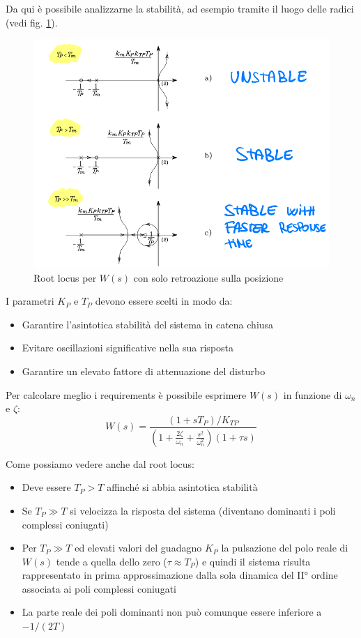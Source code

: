 Da qui è possibile analizzarne la stabilità, ad esempio tramite il luogo delle radici (vedi fig. \ref{fig:rootlocus1}).

\begin{figure}[ht!]
	\centering
	\includegraphics[width=0.7\linewidth]{images/root_locus_1}
	\caption{Root locus per $W(s)$ con solo retroazione sulla posizione}
	\label{fig:rootlocus1}
\end{figure}


I parametri $K_P$ e $T_P$ devono essere scelti in modo da:
\begin{itemize}
	\item Garantire l’asintotica stabilità del sistema in catena chiusa
	\item Evitare oscillazioni significative nella sua risposta
	\item Garantire un elevato fattore di attenuazione del disturbo 
\end{itemize}


Per calcolare meglio i requirements è possibile esprimere $W(s)$ in funzione di $\omega_n$ e $\zeta$:
$$
W(s) = \frac{(1+sT_P)/K_{TP}}{\left( 1 + \frac{2\zeta}{\omega_n} + \frac{s^2}{\omega_n^2} \right) (1+\tau s) }
$$

Come possiamo vedere anche dal root locus:
\begin{itemize}
	\item Deve essere $T_P > T$ affinché si abbia asintotica stabilità
	\item Se $T_P \gg T$ si velocizza la risposta del sistema (diventano dominanti i poli complessi coniugati)
	\item Per $T_P \gg T$ ed elevati valori del guadagno $K_P$ la pulsazione del polo reale di $W(s)$ tende a quella dello zero ($\tau \approx T_P$) e quindi il sistema risulta rappresentato in prima approssimazione dalla sola dinamica del II° ordine associata ai poli complessi coniugati
	\item La parte reale dei poli dominanti non può comunque essere inferiore a $-1/(2T)$
\end{itemize}

